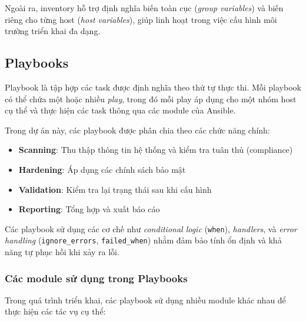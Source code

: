 \noindent Ngoài ra, inventory hỗ trợ định nghĩa biến toàn cục (\textit{group variables}) và biến riêng cho từng host (\textit{host variables}), giúp linh hoạt trong việc cấu hình môi trường triển khai đa dạng.


\subsection{Playbooks}

\noindent Playbook là tập hợp các task được định nghĩa theo thứ tự thực thi. Mỗi playbook có thể chứa một hoặc nhiều \textit{play}, trong đó mỗi play áp dụng cho một nhóm host cụ thể và thực hiện các task thông qua các module của Ansible.

\noindent Trong dự án này, các playbook được phân chia theo các chức năng chính:

\begin{itemize}
\item \textbf{Scanning}: Thu thập thông tin hệ thống và kiểm tra tuân thủ (compliance)
\item \textbf{Hardening}: Áp dụng các chính sách bảo mật
\item \textbf{Validation}: Kiểm tra lại trạng thái sau khi cấu hình
\item \textbf{Reporting}: Tổng hợp và xuất báo cáo
\end{itemize}

\noindent Các playbook sử dụng các cơ chế như \textit{conditional logic} (\texttt{when}), \textit{handlers}, và \textit{error handling} (\texttt{ignore\_errors}, \texttt{failed\_when}) nhằm đảm bảo tính ổn định và khả năng tự phục hồi khi xảy ra lỗi.

\subsubsection{Các module sử dụng trong Playbooks}

\noindent Trong quá trình triển khai, các playbook sử dụng nhiều module khác nhau để thực hiện các tác vụ cụ thể:


